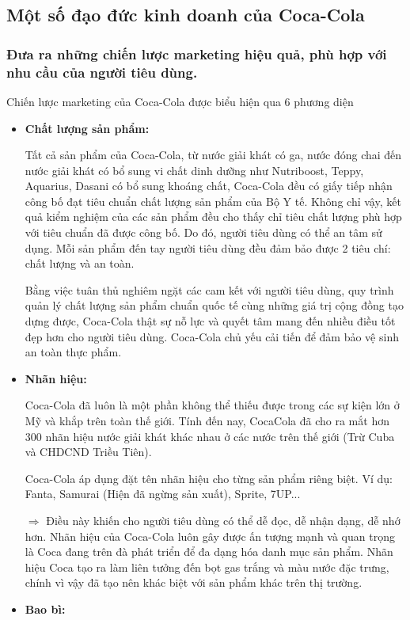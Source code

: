 \documentclass{article}
\begin{document}
\subsection{Một số đạo đức kinh doanh của Coca-Cola}
    \subsubsection{Đưa ra những chiến lược marketing hiệu quả, phù hợp với nhu cầu của người tiêu dùng.}
    \vspace{0.2cm}
    Chiến lược marketing của Coca-Cola được biểu hiện qua 6 phương diện
    \begin{itemize}
        \item \textbf{Chất lượng sản phẩm:}
        
        \qquad Tất cả sản phẩm của Coca-Cola, từ nước giải khát có ga, nước đóng chai đến nước giải khát có bổ sung vi chất dinh dưỡng như Nutriboost, Teppy, Aquarius, Dasani có bổ sung khoáng chất, Coca-Cola đều có giấy tiếp nhận công bố đạt tiêu chuẩn chất lượng sản phẩm của Bộ Y tế. Không chỉ vậy, kết quả kiểm nghiệm của các sản phẩm đều cho thấy chỉ tiêu chất lượng phù hợp với tiêu chuẩn đã được công bố. Do đó, người tiêu dùng có thể an tâm sử dụng. Mỗi sản phẩm đến tay người tiêu dùng đều đảm bảo được 2 tiêu chí: chất lượng và an toàn.

        \qquad Bằng việc tuân thủ nghiêm ngặt các cam kết với người tiêu dùng, quy trình quản lý chất lượng sản phẩm chuẩn quốc tế cùng những giá trị cộng đồng tạo dựng được, Coca-Cola thật sự nỗ lực và quyết tâm mang đến nhiều điều tốt đẹp hơn cho người tiêu dùng. Coca-Cola chủ yếu cải tiến để đảm bảo vệ sinh an toàn thực phẩm.
        \item \textbf{Nhãn hiệu:}
        
        \qquad Coca-Cola đã luôn là một phần không thể thiếu được trong các sự kiện lớn ở Mỹ và khắp trên toàn thế giới. Tính đến nay, CocaCola đã cho ra mắt hơn 300 nhãn hiệu nước giải khát khác nhau ở các nước trên thế giới (Trừ Cuba và CHDCND Triều Tiên).

        \qquad Coca-Cola áp dụng đặt tên nhãn hiệu cho từng sản phẩm riêng biệt. Ví dụ: Fanta, Samurai (Hiện đã ngừng sản xuất), Sprite, 7UP...

        \quad $\Rightarrow$ Điều này khiến cho người tiêu dùng có thể dễ đọc, dễ nhận dạng, dễ nhớ hơn. Nhãn hiệu của Coca-Cola luôn gây được ấn tượng mạnh và quan trọng là Coca đang trên đà phát triển để đa dạng hóa danh mục sản phẩm. Nhãn hiệu Coca tạo ra làm liên tưởng đến bọt gas trắng và màu nước đặc trưng, chính vì vậy đã tạo nên khác biệt với sản phẩm khác trên thị trường.
        \item \textbf{Bao bì:}
        

\end{itemize}
\end{document}
